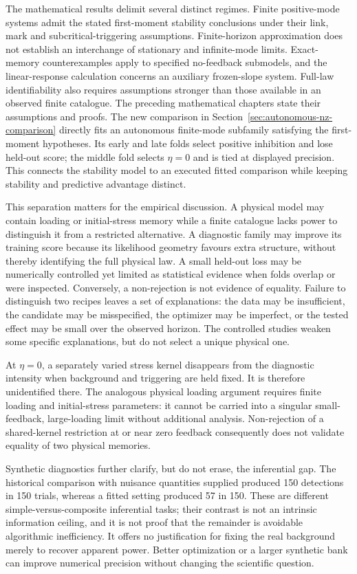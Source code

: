 The mathematical results delimit several distinct regimes. Finite positive-mode systems admit the stated first-moment stability conclusions under their link, mark and subcritical-triggering assumptions. Finite-horizon approximation does not establish an interchange of stationary and infinite-mode limits. Exact-memory counterexamples apply to specified no-feedback submodels, and the linear-response calculation concerns an auxiliary frozen-slope system. Full-law identifiability also requires assumptions stronger than those available in an observed finite catalogue. The preceding mathematical chapters state their assumptions and proofs. The new comparison in Section~\ref{sec:autonomous-nz-comparison} directly fits an autonomous finite-mode subfamily satisfying the first-moment hypotheses. Its early and late folds select positive inhibition and lose held-out score; the middle fold selects $\eta=0$ and is tied at displayed precision. This connects the stability model to an executed fitted comparison while keeping stability and predictive advantage distinct.

This separation matters for the empirical discussion. A physical model may contain loading or initial-stress memory while a finite catalogue lacks power to distinguish it from a restricted alternative. A diagnostic family may improve its training score because its likelihood geometry favours extra structure, without thereby identifying the full physical law. A small held-out loss may be numerically controlled yet limited as statistical evidence when folds overlap or were inspected. Conversely, a non-rejection is not evidence of equality. Failure to distinguish two recipes leaves a set of explanations: the data may be insufficient, the candidate may be misspecified, the optimizer may be imperfect, or the tested effect may be small over the observed horizon. The controlled studies weaken some specific explanations, but do not select a unique physical one.

At \(\eta=0\), a separately varied stress kernel disappears from the diagnostic intensity when background and triggering are held fixed. It is therefore unidentified there. The analogous physical loading argument requires finite loading and initial-stress parameters: it cannot be carried into a singular small-feedback, large-loading limit without additional analysis. Non-rejection of a shared-kernel restriction at or near zero feedback consequently does not validate equality of two physical memories.

Synthetic diagnostics further clarify, but do not erase, the inferential gap. The historical comparison with nuisance quantities supplied produced 150 detections in 150 trials, whereas a fitted setting produced 57 in 150. These are different simple-versus-composite inferential tasks; their contrast is not an intrinsic information ceiling, and it is not proof that the remainder is avoidable algorithmic inefficiency. It offers no justification for fixing the real background merely to recover apparent power. Better optimization or a larger synthetic bank can improve numerical precision without changing the scientific question.

